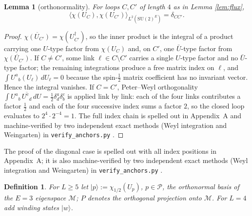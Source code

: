 \documentclass[11pt]{article}
\newtheorem{lemma}[theorem]{Lemma}
\newtheorem{definition}[theorem]{Definition}
\newcommand{\G}{{\mathrm{SU}}(2)}
\begin{document}
\begin{lemma}[orthonormality]\label{lem:gram}
For loops $C,C'$ of length $4$ as in Lemma \ref{lem:flux},
\[
\bigl\langle \chi(U_C),\chi(U_{C'})\bigr\rangle_{L^2(\G^E)}
=\delta_{CC'} .
\]
\end{lemma}
\begin{proof}
$\overline{\chi(U_{C'})}=\chi(U_{C'}^\dagger)$, so the inner product is the
integral of a product carrying one $U$-type factor from $\chi(U_C)$ and, on
$C'$, one $\bar U$-type factor from $\overline{\chi(U_{C'})}$. If $C\ne C'$,
some link $\ell\in C\setminus C'$ carries a single $U$-type factor and no
$\bar U$-type factor; the remaining integrations produce a free matrix index
on $\ell$, and $\int U^a{}_b(U_\ell)\,dU_\ell=0$ because the spin-$\tfrac12$
matrix coefficient has no invariant vector. Hence the integral vanishes.
If $C=C'$, Peter--Weyl orthogonality
$\int U^a{}_b\,\overline{U^c{}_d}\,dU=\frac12\delta^a_d\delta^c_b$ is
applied link by link: each of the four links contributes a factor $\tfrac12$
and each of the four successive index sums a factor $2$, so the closed loop
evaluates to $2^4\cdot 2^{-4}=1$. The full index chain is spelled out in
Appendix~A and machine-verified by two independent exact methods (Weyl
integration and Weingarten) in \texttt{verify\_anchors.py} \cite{YM04code}.
\end{proof}
The proof of the diagonal case is spelled out with all index positions in
Appendix~A; it is also machine-verified by two independent exact methods
(Weyl integration and Weingarten) in \texttt{verify\_anchors.py}
\cite{YM04code}.

\begin{definition}\label{def:basis}
For $L\ge5$ let $|p\rangle:=\chi_{1/2}(U_p)$, $p\in\mathcal P$, the
orthonormal basis of the $E=3$ eigenspace $\mathcal M$; $P$ denotes the
orthogonal projection onto $\mathcal M$. For $L=4$ add winding states $|w\rangle$.
\end{definition}
\end{document}
